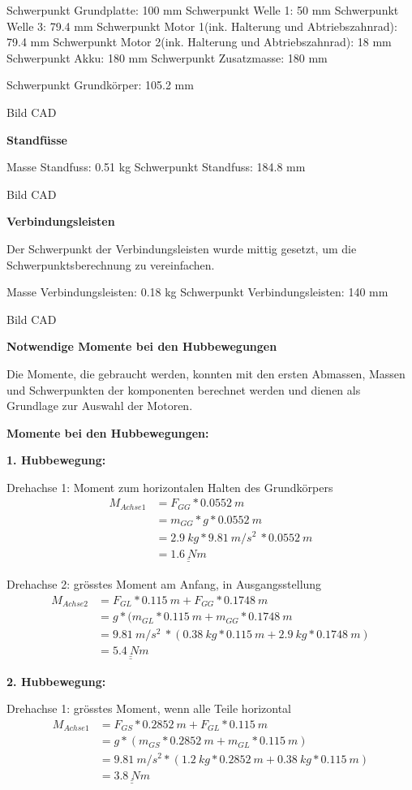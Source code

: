 Schwerpunkt Grundplatte: 100 mm
Schwerpunkt Welle 1: 50 mm
Schwerpunkt Welle 3: 79.4 mm
Schwerpunkt Motor 1(ink. Halterung und Abtriebszahnrad): 79.4 mm
Schwerpunkt Motor 2(ink. Halterung und Abtriebszahnrad): 18 mm
Schwerpunkt Akku: 180 mm
Schwerpunkt Zusatzmasse: 180 mm

Schwerpunkt Grundkörper: 105.2 mm

Bild CAD

\textbf{Standfüsse}

Masse Standfuss: 0.51 kg
Schwerpunkt Standfuss: 184.8 mm

Bild CAD

\textbf{Verbindungsleisten}

Der Schwerpunkt der Verbindungsleisten wurde mittig gesetzt, um die Schwerpunktsberechnung zu vereinfachen.

Masse Verbindungsleisten: 0.18 kg
Schwerpunkt Verbindungsleisten: 140 mm

Bild CAD

\textbf{Notwendige Momente bei den Hubbewegungen}

Die Momente, die gebraucht werden, konnten mit den ersten Abmassen, Massen und Schwerpunkten der komponenten berechnet werden und dienen als Grundlage zur Auswahl der Motoren.

\textbf{Momente bei den Hubbewegungen:}

\textbf{1. Hubbewegung:}

Drehachse 1: Moment zum horizontalen Halten des Grundkörpers
\begin{align*}
    M_{Achse 1} &= F_{GG} * 0.0552\ m \\
    &= m_{GG} * g * 0.0552\ m \\
    &= 2.9\ kg * 9.81\ m/s^2\ * 0.0552\ m \\
    &= \underline{\underline{1.6\ Nm}}
\end{align*}

Drehachse 2: grösstes Moment am Anfang, in Ausgangsstellung
\begin{align*}
    M_{Achse 2} &= F_{GL} * 0.115\ m + F_{GG} * 0.1748\ m \\
    &= g * (m_{GL} * 0.115\ m + m_{GG} * 0.1748\ m \\
    &= 9.81\ m/s^2\ * (0.38\ kg * 0.115\ m + 2.9\ kg * 0.1748\ m) \\
    &= \underline{\underline{5.4\ Nm}}
\end{align*}

\textbf{2. Hubbewegung:}

Drehachse 1: grösstes Moment, wenn alle Teile horizontal
\begin{align*}
    M_{Achse 1} &= F_{GS} * 0.2852\ m + F_{GL} * 0.115\ m \\
    &= g * (m_{GS} * 0.2852\ m + m_{GL} * 0.115\ m) \\
    &= 9.81\ m/s^2 * (1.2\ kg * 0.2852\ m + 0.38\ kg * 0.115\ m) \\
    &= \underline{\underline{3.8\ Nm}}
\end{align*}


